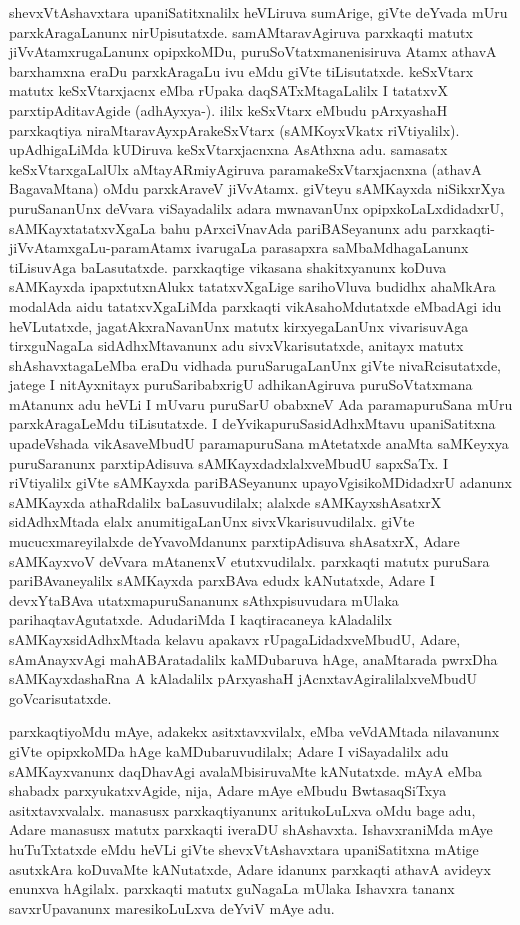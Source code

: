 shevxVtAshavxtara upaniSatitxnalilx heVLiruva sumArige, giVte deYvada mUru parxkAra\-gaLanunx nirUpisutatxde. samAMtaravAgiruva parxkaqti matutx jiVvAtamxrugaLanunx opipx\-koMDu, puruSoVtatxmanenisiruva Atamx athavA barxhamxna eraDu parxkAragaLu ivu eMdu giVte tiLisutatxde. keSxVtarx matutx keSxVtarxjacnx eMba rUpaka daqSATxMtagaLalilx I tatatxvX parxti\-pAdita\-vAgide (adhAyxya-). ililx keSxVtarx eMbudu pArxyashaH parxkaqtiya niraMtaravAyxpAra\-keSxVtarx (sAMKoyxVkatx riVtiyalilx). upAdhigaLiMda kUDiruva keSxVtarxjacnxna AsAthxna adu. samasatx keSxVtarxgaLalUlx aMtayARmiyAgiruva paramakeSxVtarxjacnxna (athavA BagavaMtana) oMdu parxkAraveV jiVvAtamx. giVteyu sAMKayxda niSikxrXya puruSananUnx deVvara viSaya\-dalilx adara mwnavanUnx opipxkoLaLxdidadxrU, sAMKayxtatatxvXgaLa bahu pArxciVnavAda pari\-BASeyanunx adu parxkaqti-jiVvAtamxgaLu-paramAtamx ivarugaLa parasapxra saMbaMdhagaLanunx tiLisuvAga baLasutatxde. parxkaqtige vikasana shakitxyanunx koDuva sAMKayxda ipapxtutxnAlukx tatatxvXgaLige sarihoVluva budidhx ahaMkAra modalAda aidu tatatxvXgaLiMda parxkaqti vikAsahoMdutatxde eMbadAgi idu heVLutatxde, jagatAkxraNavanUnx matutx kirxyegaLanUnx vivarisuvAga tirxguNagaLa sidAdhxMtavanunx adu sivxVkarisutatxde, anitayx matutx shAshavxtagaLeMba eraDu vidhada puruSarugaLanUnx giVte nivaRcisutatxde, jatege I nitAyxnitayx puruSaribabxrigU adhikanAgiruva puruSoVtatxmana mAtanunx adu heVLi I mUvaru puruSarU obabxneV Ada paramapuruSana mUru parxkAragaLeMdu tiLisutatxde. I deYvikapuruSasidAdhxMtavu upaniSatitxna upadeVshada vikAsaveMbudU paramapuruSana mAtetatxde anaMta saMKeyxya puruSaranunx parxtipAdisuva sAMKayxdadxlalxveMbudU sapxSaTx. I riVtiyalilx giVte sAMKayxda pariBASeyanunx upayoVgisikoMDidadxrU adanunx sAMKayxda athaRdalilx baLasuvudilalx; alalxde sAMKayxshAsatxrX sidAdhxMtada elalx anumitigaLanUnx sivxVkarisuvudilalx. giVte mucucxmareyilalxde deYvavoMdanunx parxtipAdisuva shAsatxrX, Adare sAMKayxvoV deVvara mAtanenxV etutxvudilalx. parxkaqti matutx puruSara pariBAvaneyalilx sAMKayxda parxBAva edudx kANutatxde, Adare I devxYtaBAva utatxmapuruSananunx sAthxpisuvudara mUlaka parihaqtavAgutatxde. AdudariMda I kaqtiracaneya kAladalilx sAMKayxsidAdhxMtada kelavu apakavx rUpagaLidadxveMbudU, Adare, sAmAnayxvAgi mahABAratadalilx kaMDubaruva hAge, anaMtarada pwrxDha sAMKayxdashaRna A kAladalilx pArxyashaH jAcnxtavAgiralilalxveMbudU goVcarisutatxde.

parxkaqtiyoMdu mAye, adakekx asitxtavxvilalx, eMba veVdAMtada nilavanunx giVte opipxkoMDa hAge kaMDubaruvudilalx; Adare I viSayadalilx adu sAMKayxvanunx daqDhavAgi avalaMbisiruvaMte kANutatxde. mAyA eMba shabadx parxyukatxvAgide, nija, Adare mAye eMbudu BwtasaqSiTxya asitxtavxvalalx. manasusx parxkaqtiyanunx aritukoLuLxva oMdu bage adu, Adare manasusx matutx parxkaqti iveraDU shAshavxta. IshavxraniMda mAye huTuTxtatxde eMdu heVLi giVte shevxVtAshavxtara upaniSatitxna mAtige asutxkAra koDuvaMte kANutatxde, Adare idanunx parxkaqti athavA avideyx enunxva hAgilalx. parxkaqti matutx guNagaLa mUlaka Ishavxra tananx savxrUpavanunx maresikoLuLxva deYviV mAye adu.

